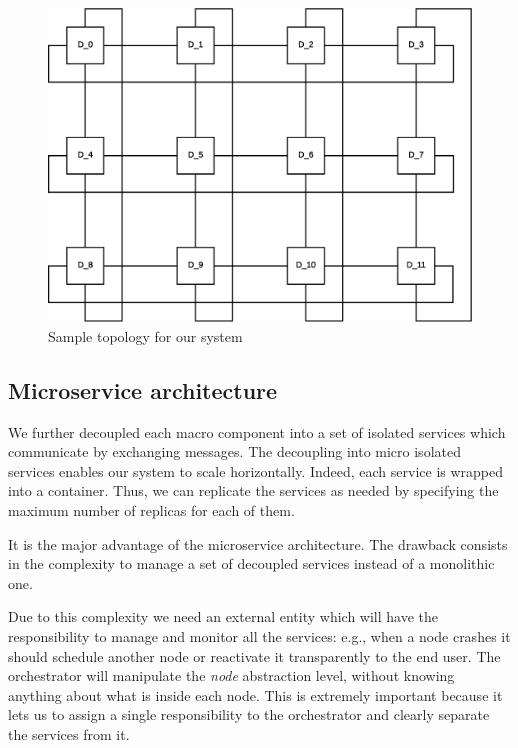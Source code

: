 \begin{figure}[H]
  \centering
  \includegraphics[scale=0.5,keepaspectratio]
    {images/solution/topology.eps}
  \caption{Sample topology for our system}
  \label{fig:sd-sys-arch-topology}
\end{figure}


\subsection{Microservice architecture}

We further decoupled each macro component into a set of isolated services
which communicate by exchanging messages. The decoupling into micro isolated
services enables our system to scale horizontally. Indeed, each service is wrapped
into a container. Thus, we can replicate
the services as needed by specifying the maximum number of replicas
for each of them.


It is the major advantage
of the microservice architecture.
The drawback consists in the complexity to manage a set of decoupled
services instead of a monolithic one.


Due to this complexity
we need an external entity which
will have the responsibility to manage and monitor all the services:
e.g., when a node crashes it should schedule another node or reactivate it
transparently to the end user.
The orchestrator will
manipulate the \textit{node} abstraction level, without knowing anything about
what is inside each node. This is extremely important because it
lets us to assign
a single responsibility to the orchestrator and clearly
separate the services from it.


